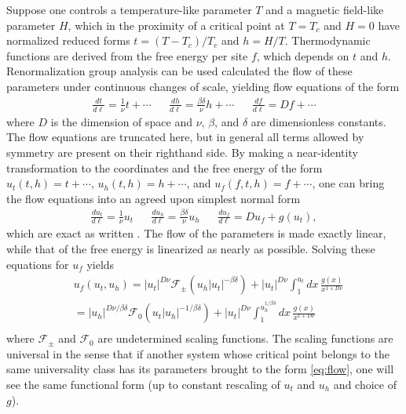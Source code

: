 \documentclass[
  aps,
  pre,
  reprint,
  longbibliography,
  floatfix
]{revtex4-2}
\begin{document}
Suppose one controls a temperature-like parameter $T$ and a magnetic field-like
parameter $H$, which in the proximity of a critical point at $T=T_c$ and $H=0$
have normalized reduced forms $t=(T-T_c)/T_c$ and $h=H/T$. Thermodynamic
functions are derived from the free energy per site $f$, which depends on $t$
and $h$. Renormalization group analysis can be used calculated the flow of
these parameters under continuous changes of scale, yielding flow equations of
the form
\begin{align} \label{eq:raw.flow}
  \frac{dt}{d\ell}=\frac1\nu t+\cdots
  &&
  \frac{dh}{d\ell}=\frac{\beta\delta}\nu h+\cdots
  &&
  \frac{df}{d\ell}=Df+\cdots
\end{align}
where $D$ is the dimension of space and $\nu$, $\beta$, and $\delta$ are
dimensionless constants. The flow equations are truncated here, but in general
all terms allowed by symmetry are present on their righthand side. By making a
near-identity transformation to the coordinates and the free energy of the form
$u_t(t, h)=t+\cdots$, $u_h(t, h)=h+\cdots$, and $u_f(f,t,h)=f+\cdots$, one can
bring the flow equations into an agreed upon simplest normal form
\begin{align} \label{eq:flow}
  \frac{du_t}{d\ell}=\frac1\nu u_t
  &&
  \frac{du_h}{d\ell}=\frac{\beta\delta}\nu u_h
  &&
  \frac{du_f}{d\ell}=Du_f+g(u_t),
\end{align}
which are exact as written \cite{Raju_2019_Normal}. The flow of the parameters is made exactly linear,
while that of the free energy is linearized as nearly as possible. Solving these equations for $u_f$ yields
\begin{equation}
  \begin{aligned}
    &u_f(u_t, u_h)
    =|u_t|^{D\nu}\mathcal F_\pm(u_h|u_t|^{-\beta\delta})+|u_t|^{D\nu}\int_1^{u_t}dx\,\frac{g(x)}{x^{1+D\nu}} \\
    &=|u_h|^{D\nu/\beta\delta}\mathcal F_0(u_t|u_h|^{-1/\beta\delta})+|u_t|^{D\nu}\int_1^{u_h^{1/\beta\delta}}dx\,\frac{g(x)}{x^{1+D\nu}} \\
  \end{aligned}
\end{equation}
where $\mathcal F_\pm$ and $\mathcal F_0$ are undetermined scaling functions.
The scaling functions are universal in the sense that if another system whose
critical point belongs to the same universality class has its parameters
brought to the form \eqref{eq:flow}, one will see the same functional form (up
to constant rescaling of $u_t$ and $u_h$ and choice of $g$).
\end{document}
